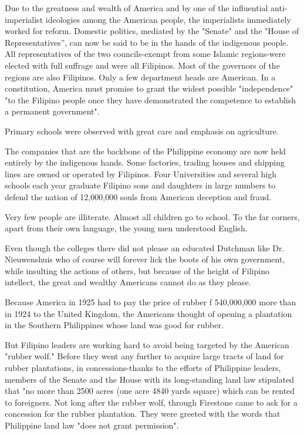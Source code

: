 Due to the greatness and wealth of America and by one of the influential anti-imperialist 
ideologies among the American people, the imperialists immediately worked for reform. 
Domestic politics, mediated by the "Senate" and the "House of Representatives'', can now 
be said to be in the hands of the indigenous people. All representatives of the two councils-exempt 
from some Islamic regions-were elected with full suffrage and were all Filipinos. Most of the 
governors of the regions are also Filipinos. Only a few department heads are American. In a 
constitution, America must promise to grant the widest possible "independence" "to the Filipino 
people once they have demonstrated the competence to establish a permanent government".\nline

Primary schools were observed with great care and emphasis on agriculture.\nline

The companies that are the backbone of the Philippine economy are now held entirely 
by the indigenous hands. Some factories, trading houses and shipping lines are owned 
or operated by Filipinos. Four Universities and several high schools each year graduate 
Filipino sons and daughters in large numbers to defend the nation of 12,000,000 souls from American deception and fraud.\nline

Very few people are illiterate. Almost all children go to school. To the far corners, 
apart from their own language, the young men understood English.\nline

Even though the colleges there did not please an educated Dutchman like Dr. Nieuwenshuis 
who of course will forever lick the boots of his own government, while insulting the actions 
of others, but because of the height of Filipino intellect, the great and wealthy Americans cannot do as they please.\nline

Because America in 1925 had to pay the price of rubber f 540,000,000 more than in 1924 to 
the United Kingdom, the Americans thought of opening a plantation in the Southern Philippines whose land was good for rubber.\nline

But Filipino leaders are working hard to avoid being targeted by the American "rubber wolf." 
Before they went any further to acquire large tracts of land for rubber plantations, in 
concessions-thanks to the efforts of Philippine leaders, members of the Senate and the House 
with its long-standing land law stipulated that "no more than 2500 acres (one acre 4840 yards square) 
which can be rented to foreigners. Not long after the rubber wolf, through Firestone came to ask for a 
concession for the rubber plantation. They were greeted with the words that Philippine land law "does not grant permission".\nline

